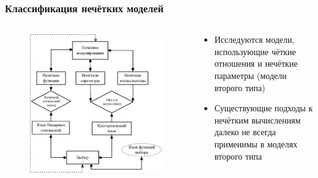 \documentclass[12pt]{beamer}
\begin{document}
\begin{frame}
  \frametitle{Классификация нечётких моделей}
  \begin{columns}[onlytextwidth]
    \begin{column}{0.6\textwidth}
      \begin{figure}[h]
        \includegraphics[width=\textwidth]{choice-classification}
      \end{figure}
    \end{column}
    \begin{column}{0.4\textwidth}
      \begin{itemize}
        \item Исследуются модели, использующие чёткие отношения и нечёткие параметры (модели второго типа)
        \item Существующие подходы к нечётким вычислениям далеко не всегда применимы в моделях второго типа
      \end{itemize}
    \end{column}
  \end{columns}
\end{frame}
\end{document}
